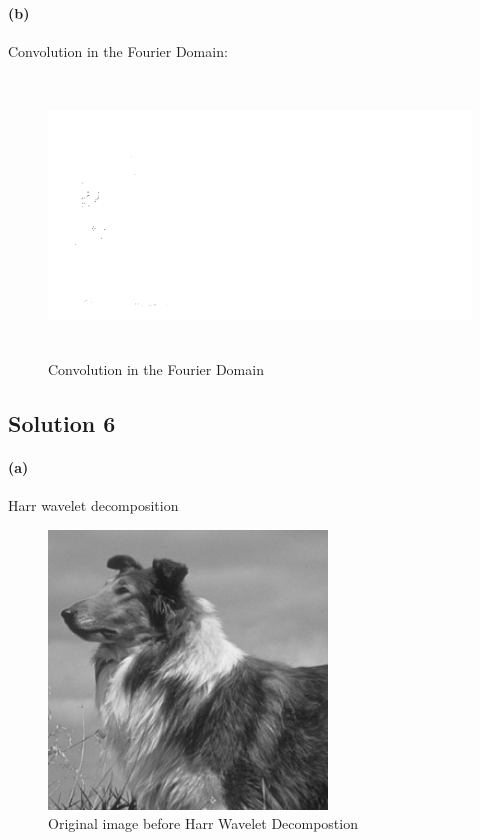 \documentclass{article}
\newcommand{\solution}[1]{\clearpage \subsection*{Solution #1}}  %
\newcommand{\spart}[1]{\paragraph{(#1)}}
\begin{document}
\spart{b}  Convolution in the Fourier Domain:

\begin{figure}[h!]
  \centering
  	\includegraphics[height=20em]{code/outputs/prob5.png}
  \caption{Convolution in the Fourier Domain}
\end{figure}

\solution{6}
\spart{a} Harr wavelet decomposition
\begin{figure}[h!]
  \centering
  	\includegraphics[height=20em]{code/inputs/p6_inp.png}
  \caption{Original image before Harr Wavelet Decompostion}
\end{figure}
\end{document}
